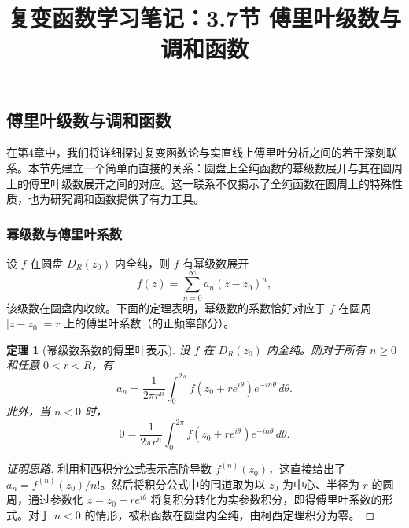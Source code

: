 \documentclass[UTF8]{ctexart}
\title{复变函数学习笔记：3.7节 傅里叶级数与调和函数}
\author{}
\date{}
\newtheorem{theorem}{定理}[section]
\numberwithin{equation}{section}
\begin{document}
\maketitle

\setcounter{section}{3}
\setcounter{subsection}{6}
\subsection{傅里叶级数与调和函数}

在第4章中，我们将详细探讨复变函数论与实直线上傅里叶分析之间的若干深刻联系。本节先建立一个简单而直接的关系：圆盘上全纯函数的幂级数展开与其在圆周上的傅里叶级数展开之间的对应。这一联系不仅揭示了全纯函数在圆周上的特殊性质，也为研究调和函数提供了有力工具。

\subsubsection{幂级数与傅里叶系数}

设 $f$ 在圆盘 $D_R(z_0)$ 内全纯，则 $f$ 有幂级数展开
\[
f(z) = \sum_{n=0}^\infty a_n (z-z_0)^n ,
\]
该级数在圆盘内收敛。下面的定理表明，幂级数的系数恰好对应于 $f$ 在圆周 $|z-z_0|=r$ 上的傅里叶系数（的正频率部分）。

\begin{theorem}[幂级数系数的傅里叶表示]
设 $f$ 在 $D_R(z_0)$ 内全纯。则对于所有 $n\ge 0$ 和任意 $0<r<R$，有
\[
a_n = \frac{1}{2\pi r^n} \int_0^{2\pi} f(z_0 + re^{i\theta}) e^{-in\theta}\,d\theta .
\]
此外，当 $n<0$ 时，
\[
0 = \frac{1}{2\pi r^n} \int_0^{2\pi} f(z_0 + re^{i\theta}) e^{-in\theta}\,d\theta .
\]
\end{theorem}

\begin{proof}[证明思路]
利用柯西积分公式表示高阶导数 $f^{(n)}(z_0)$，这直接给出了 $a_n = f^{(n)}(z_0)/n!$。然后将积分公式中的围道取为以 $z_0$ 为中心、半径为 $r$ 的圆周，通过参数化 $z = z_0 + re^{i\theta}$ 将复积分转化为实参数积分，即得傅里叶系数的形式。对于 $n<0$ 的情形，被积函数在圆盘内全纯，由柯西定理积分为零。
\end{proof}
\end{document}
